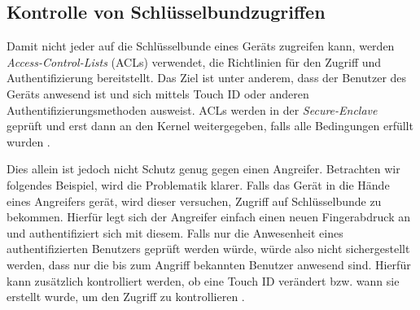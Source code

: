 \subsection{Kontrolle von Schlüsselbundzugriffen}
Damit nicht jeder auf die Schlüsselbunde eines Geräts zugreifen kann, werden
\textit{Access-Control-Lists} (ACLs) verwendet, die Richtlinien für den Zugriff
und Authentifizierung bereitstellt. Das Ziel ist unter anderem, dass der
Benutzer des Geräts anwesend ist und sich mittels Touch ID oder anderen
Authentifizierungsmethoden ausweist. ACLs werden in der \textit{Secure-Enclave}
geprüft und erst dann an den Kernel weitergegeben, falls alle Bedingungen
erfüllt wurden \cite{apple2020}.

Dies allein ist jedoch nicht Schutz genug gegen einen Angreifer. Betrachten wir
folgendes Beispiel, wird die Problematik klarer. Falls das Gerät in die Hände
eines Angreifers gerät, wird dieser versuchen, Zugriff auf Schlüsselbunde zu
bekommen. Hierfür legt sich der Angreifer einfach einen neuen Fingerabdruck an
und authentifiziert sich mit diesem. Falls nur die Anwesenheit eines
authentifizierten Benutzers geprüft werden würde, würde also nicht
sichergestellt werden, dass nur die bis zum Angriff bekannten Benutzer anwesend
sind. Hierfür kann zusätzlich kontrolliert werden, ob eine Touch ID verändert
bzw. wann sie erstellt wurde, um den Zugriff zu kontrollieren \cite{apple2020}.
